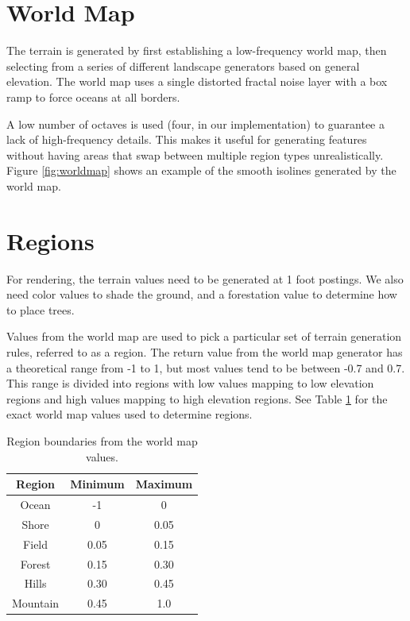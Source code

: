 \section{World Map} \label{sec:worldmap}

The terrain is generated by first establishing a low-frequency world map, then selecting from a series of different landscape generators based on general elevation.
The world map uses a single distorted fractal noise layer with a box ramp to force oceans at all borders.

A low number of octaves is used (four, in our implementation) to guarantee a lack of high-frequency details.
This makes it useful for generating features without having areas that swap between multiple region types unrealistically.
Figure \ref{fig:worldmap} shows an example of the smooth isolines generated by the world map.

\section{Regions} \label{sec:region}

For rendering, the terrain values need to be generated at 1 foot postings.
We also need color values to shade the ground, and a forestation value to determine how to place trees.

Values from the world map are used to pick a particular set of terrain generation rules, referred to as a region.
The return value from the world map generator has a theoretical range from -1 to 1, but most values tend to be between -0.7 and 0.7.
This range is divided into regions with low values mapping to low elevation regions and high values mapping to high elevation regions.
See Table \ref{tab:regions} for the exact world map values used to determine regions.

\begin{table}
	\centering
	\begin{tabular}{ || c | c | c || }
		\hline
		Region & Minimum & Maximum \\ [0.5ex]
		\hline\hline
		Ocean & -1 & 0 \\
		\hline
		Shore & 0 & 0.05 \\
		\hline
		Field & 0.05 & 0.15 \\
		\hline
		Forest & 0.15 & 0.30 \\
		\hline
		Hills & 0.30 & 0.45 \\
		\hline
		Mountain & 0.45 & 1.0 \\ [1ex]
		\hline
	\end{tabular}
	\caption{Region boundaries from the world map values.}
	\label{tab:regions}
\end{table}

